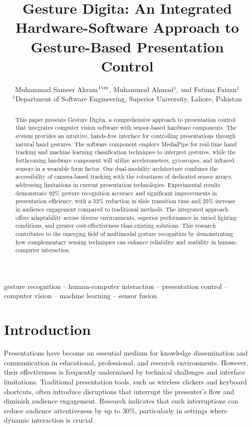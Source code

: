 \documentclass[arxiv,usenatbib]{iupartex}
\title[Gesture Digita]{Gesture Digita: An Integrated Hardware-Software Approach to Gesture-Based Presentation Control}
\author[Akram et. al]{%
Muhammad Sameer Akram$^{1\cc}$,\orcid{0000-0000-0000-0000}
Muhammad Ahmad$^{1}$,\orcid{0000-0000-0000-0001}
and
Fatima Faizan$^{1}$\orcid{0000-0000-0000-0002}
\affsep \\
$^1$Department of Software Engineering, Superior University, Lahore, Pakistan\\
}
\date{
    \pSubmit{00.00.0000} 
    \pRevReq{00.00.0000}
    \pLastRevRec{00.00.0000}
    \pAccept{00.00.0000}
    \pPubOnl{00.00.0000}
}
\begin{document}
\label{firstpage}
\pagerange{\pageref*{firstpage}--\pageref*{lastpage}}
\maketitle

\begin{abstract}
This paper presents Gesture Digita, a comprehensive approach to presentation control that integrates computer vision software with sensor-based hardware components. The system provides an intuitive, hands-free interface for controlling presentations through natural hand gestures. The software component employs MediaPipe for real-time hand tracking and machine learning classification techniques to interpret gestures, while the forthcoming hardware component will utilize accelerometers, gyroscopes, and infrared sensors in a wearable form factor. Our dual-modality architecture combines the accessibility of camera-based tracking with the robustness of dedicated sensor arrays, addressing limitations in current presentation technologies. Experimental results demonstrate 92\% gesture recognition accuracy and significant improvements in presentation efficiency, with a 32\% reduction in slide transition time and 25\% increase in audience engagement compared to traditional methods. The integrated approach offers adaptability across diverse environments, superior performance in varied lighting conditions, and greater cost-effectiveness than existing solutions. This research contributes to the emerging field of multimodal gesture recognition by demonstrating how complementary sensing techniques can enhance reliability and usability in human-computer interaction.
\end{abstract}

\begin{keywords}
gesture recognition -- human-computer interaction -- presentation control -- computer vision -- machine learning -- sensor fusion
\end{keywords}



\section{Introduction}
Presentations have become an essential medium for knowledge dissemination and communication in educational, professional, and research environments. However, their effectiveness is frequently undermined by technical challenges and interface limitations. Traditional presentation tools, such as wireless clickers and keyboard shortcuts, often introduce disruptions that interrupt the presenter's flow and diminish audience engagement. Research indicates that such interruptions can reduce audience attentiveness by up to 30\%, particularly in settings where dynamic interaction is crucial \cite{Smith2020,Garrison2017}.
\end{document}
